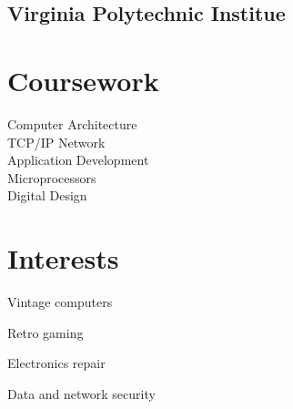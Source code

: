 \documentclass[letterpaper]{deedy-resume-openfont}
\begin{document}
\begin{minipage}[t]{0.27\textwidth}
\subsection{Virginia Polytechnic Institue}


\section{Coursework}
Computer Architecture \\
TCP/IP Network\\
\hspace{3pt} Application Development \\
Microprocessors \\
Digital Design


\section{Interests}
\vspace{\topsep} %

\begin{tightemize}
	\item Vintage computers
	\item Retro gaming
	\item Electronics repair
	\item Data and network security
\end{tightemize}

\end{minipage} %
\hfill
%
\end{document}
